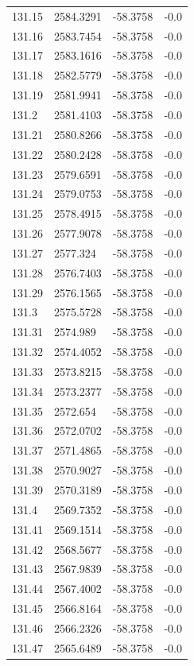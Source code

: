 \begin{table}[H]
\begin{tabular}{llll}
131.15 & 2584.3291 & -58.3758 & -0.0 \\
131.16 & 2583.7454 & -58.3758 & -0.0 \\
131.17 & 2583.1616 & -58.3758 & -0.0 \\
131.18 & 2582.5779 & -58.3758 & -0.0 \\
131.19 & 2581.9941 & -58.3758 & -0.0 \\
131.2 & 2581.4103 & -58.3758 & -0.0 \\
131.21 & 2580.8266 & -58.3758 & -0.0 \\
131.22 & 2580.2428 & -58.3758 & -0.0 \\
131.23 & 2579.6591 & -58.3758 & -0.0 \\
131.24 & 2579.0753 & -58.3758 & -0.0 \\
131.25 & 2578.4915 & -58.3758 & -0.0 \\
131.26 & 2577.9078 & -58.3758 & -0.0 \\
131.27 & 2577.324 & -58.3758 & -0.0 \\
131.28 & 2576.7403 & -58.3758 & -0.0 \\
131.29 & 2576.1565 & -58.3758 & -0.0 \\
131.3 & 2575.5728 & -58.3758 & -0.0 \\
131.31 & 2574.989 & -58.3758 & -0.0 \\
131.32 & 2574.4052 & -58.3758 & -0.0 \\
131.33 & 2573.8215 & -58.3758 & -0.0 \\
131.34 & 2573.2377 & -58.3758 & -0.0 \\
131.35 & 2572.654 & -58.3758 & -0.0 \\
131.36 & 2572.0702 & -58.3758 & -0.0 \\
131.37 & 2571.4865 & -58.3758 & -0.0 \\
131.38 & 2570.9027 & -58.3758 & -0.0 \\
131.39 & 2570.3189 & -58.3758 & -0.0 \\
131.4 & 2569.7352 & -58.3758 & -0.0 \\
131.41 & 2569.1514 & -58.3758 & -0.0 \\
131.42 & 2568.5677 & -58.3758 & -0.0 \\
131.43 & 2567.9839 & -58.3758 & -0.0 \\
131.44 & 2567.4002 & -58.3758 & -0.0 \\
131.45 & 2566.8164 & -58.3758 & -0.0 \\
131.46 & 2566.2326 & -58.3758 & -0.0 \\
131.47 & 2565.6489 & -58.3758 & -0.0 \\

\end{tabular}
\end{table}
